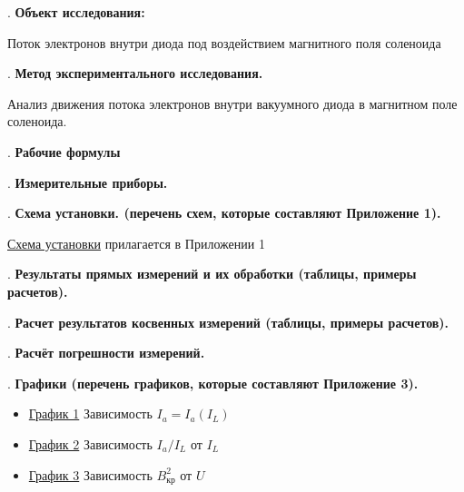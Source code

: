 \documentclass[12pt]{article}
\begin{document}
    \mediumvspace

    . \textbf{Объект исследования: } 
    
    Поток электронов внутри диода под воздействием магнитного поля соленоида

    \mediumvspace

    . \textbf{Метод экспериментального исследования.}

    Анализ движения потока электронов внутри вакуумного диода в магнитном поле соленоида.

    \newpage

    . \textbf{Рабочие формулы}

    

    . \textbf{Измерительные приборы.}

    \smallvspace

    

    \mediumvspace

    . \textbf{Схема установки. (перечень схем, которые составляют Приложение 1).}

    \hyperlink{schema1}{Схема установки} прилагается в Приложении 1

    \mediumvspace

    . \textbf{Результаты прямых измерений и их обработки (таблицы, примеры расчетов).}

    

    \mediumvspace

    . \textbf{Расчет результатов косвенных измерений (таблицы, примеры расчетов).}

    

    \mediumvspace

    . \textbf{Расчёт погрешности измерений.}
    
    

    \mediumvspace

    . \textbf{Графики (перечень графиков, которые составляют Приложение 3).}

    \begin{itemize}
        \item \hyperlink{diagram1}{График 1} Зависимость $I_a = I_a(I_L)$
        \item \hyperlink{diagram2}{График 2} Зависимость $I_a/I_L$ от $I_L$
        \item \hyperlink{diagram3}{График 3} Зависимость $B^2_\text{кр}$ от $U$
    \end{itemize}
\end{document}
